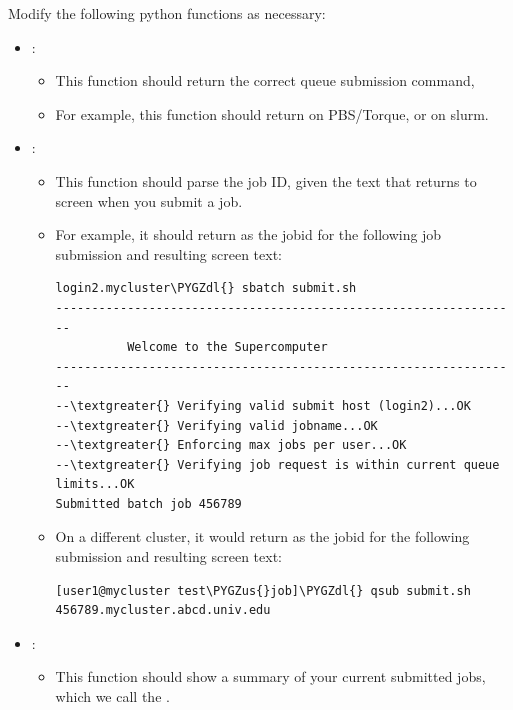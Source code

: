 \documentclass[letterpaper,10pt,english]{sphinxmanual}
\def\PYGZus{\char`\_}
\def\PYGZdl{\char`\$}
\begin{document}
Modify the following python functions as necessary:
\begin{itemize}
\item {} 
:
\begin{itemize}
\item {} 
This function should return the correct queue submission command,

\item {} 
For example, this function should return  on PBS/Torque, or  on slurm.

\end{itemize}

\item {} 
:
\begin{itemize}
\item {} 
This function should parse the job ID, given the text that returns to screen when you submit a job.

\item {} 
For example, it should return  as the jobid for the following job submission and resulting screen text:

\begin{Verbatim}[commandchars=\\\{\}]
login2.mycluster\PYGZdl{} sbatch submit.sh
-----------------------------------------------------------------
          Welcome to the Supercomputer
-----------------------------------------------------------------
--\textgreater{} Verifying valid submit host (login2)...OK
--\textgreater{} Verifying valid jobname...OK
--\textgreater{} Enforcing max jobs per user...OK
--\textgreater{} Verifying job request is within current queue limits...OK
Submitted batch job 456789
\end{Verbatim}

\item {} 
On a different cluster, it would return  as the jobid for the following submission and resulting screen text:

\begin{Verbatim}[commandchars=\\\{\}]
[user1@mycluster test\PYGZus{}job]\PYGZdl{} qsub submit.sh
456789.mycluster.abcd.univ.edu
\end{Verbatim}

\end{itemize}

\item {} 
:
\begin{itemize}
\item {} 
This function should show a summary of your current submitted jobs, which we call the .


\end{itemize}
\end{itemize}
\end{document}
